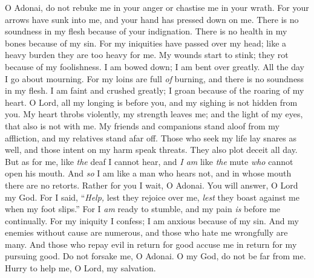 \begin{biblechapter} %
 O Adonai, do not rebuke me in your anger 
or chastise me in your wrath.
\verse For your arrows have sunk into me, 
and your hand has pressed down on me.
\verse There is no soundness in my flesh because of your indignation. 
There is no health in my bones because of my sin.
\verse For my iniquities have passed over my head; 
like a heavy burden they are too heavy for me.
\verse My wounds start to stink; they rot 
because of my foolishness.
\verse I am bowed down; I am bent over greatly. 
All the day I go about mourning.
\verse For my loins are full \textit{of} burning, 
and there is no soundness in my flesh.
\verse I am faint and crushed greatly; 
I groan because of the roaring of my heart.
\verse O Lord, all my longing is before you, 
and my sighing is not hidden from you.
\verse My heart throbs violently, my strength leaves me; 
and the light of my eyes, that also is not with me.
\verse My friends and companions stand aloof from my affliction, 
and my relatives stand afar off.
\verse Those who seek my life lay snares as well, 
and those intent on my harm speak threats. 
They also plot deceit all day.
\verse But as for me, like \textit{the} deaf I cannot hear, 
and \textit{I am} like \textit{the} mute \textit{who} cannot open his mouth.
\verse And \textit{so} I am like a man who hears not, 
and in whose mouth there are no retorts.
\verse Rather for you I wait, O Adonai. 
You will answer, O Lord my God.
\verse For I said, “\textit{Help,} lest they rejoice over me, 
\textit{lest} they boast against me when my foot slips.”
\verse For I \textit{am} ready to stumble, 
and my pain \textit{is} before me continually.
\verse For my iniquity I confess; 
I am anxious because of my sin.
\verse And my enemies without cause are numerous, 
and those who hate me wrongfully are many.
\verse And those who repay evil in return for good 
accuse me in return for my pursuing good.
\verse Do not forsake me, O Adonai. 
O my God, do not be far from me.
\verse Hurry to help me, 
O Lord, my salvation.
\end{biblechapter}

